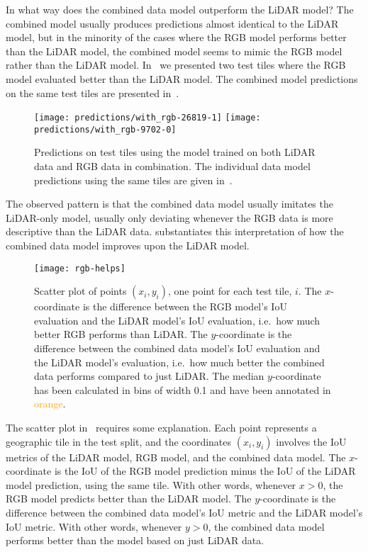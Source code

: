 In what way does the combined data model outperform the LiDAR model?
The combined model usually produces predictions almost identical to the LiDAR model, but in the minority of the cases where the RGB model performs better than the LiDAR model, the combined model seems to mimic the RGB model rather than the LiDAR model.
In~ we presented two test tiles where the RGB model evaluated better than the LiDAR model.
The combined model predictions on the same test tiles are presented in~.

\begin{figure}[H]
  \centering
  \texttt{[image: predictions/with\_rgb-26819-1]}  %
  \textcolor{gray}{\vrule}
  \texttt{[image: predictions/with\_rgb-9702-0]}  %
  \caption{%
    Predictions on test tiles using the model trained on both LiDAR data and RGB data in combination.
    The individual data model predictions using the same tiles are given in~.
  }%
  \label{fig:rgb-selection}
\end{figure}

The observed pattern is that the combined data model usually imitates the LiDAR-only model, usually only deviating whenever the RGB data is more descriptive than the LiDAR data.
 substantiates this interpretation of how the combined data model improves upon the LiDAR model.

\begin{figure}[H]
  \centering
  \texttt{[image: rgb-helps]}
  \caption{%
    Scatter plot of points $(x_i, y_i)$, one point for each test tile, $i$.
    The $x$-coordinate is the difference between the RGB model's IoU evaluation and the LiDAR model's IoU evaluation, i.e.\ how much better RGB performs than LiDAR.
    The $y$-coordinate is the difference between the combined data model's IoU evaluation and the LiDAR model's evaluation, i.e.\ how much better the combined data performs compared to just LiDAR.
    The median $y$-coordinate has been calculated in bins of width \num{0.1} and have been annotated in \textcolor{orange}{orange}.
  }%
  \label{fig:rgb-help}
\end{figure}

The scatter plot in~ requires some explanation.
Each point represents a geographic tile in the test split, and the coordinates $(x_i, y_i)$ involves the IoU metrics of the LiDAR model, RGB model, and the combined data model.
The $x$-coordinate is the IoU of the RGB model prediction minus the IoU of the LiDAR model prediction, using the same tile.
With other words, whenever $x > 0$, the RGB model predicts better than the LiDAR model.
The $y$-coordinate is the difference between the combined data model's IoU metric and the LiDAR model's IoU metric.
With other words, whenever $y > 0$, the combined data model performs better than the model based on just LiDAR data.

